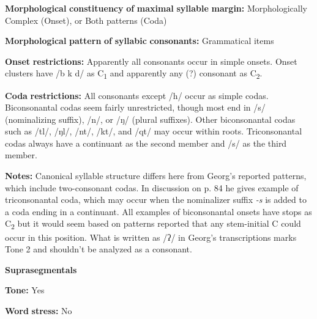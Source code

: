 \begin{styleBody}
\textbf{Morphological} \textbf{constituency} \textbf{of} \textbf{maximal} \textbf{syllable} \textbf{margin:} Morphologically Complex (Onset), or Both patterns (Coda)
\end{styleBody}

\begin{styleBody}
\textbf{Morphological} \textbf{pattern} \textbf{of} \textbf{syllabic} \textbf{consonants:} Grammatical items
\end{styleBody}

\begin{styleBody}
\textbf{Onset} \textbf{restrictions:} Apparently all consonants occur in simple onsets. Onset clusters have /b k d/ as C\textsubscript{1} and apparently any (?) consonant as C\textsubscript{2}.
\end{styleBody}

\begin{styleBody}
\textbf{Coda} \textbf{restrictions:} All consonants except /h/ occur as simple codas. Biconsonantal codas seem fairly unrestricted, though most end in /s/ (nominalizing suffix), /n/, or /ŋ/ (plural suffixes). Other biconsonantal codas such as /tl/, /ŋl/, /nt/, /kt/, and /qt/ may occur within roots. Triconsonantal codas always have a continuant as the second member and /s/ as the third member.
\end{styleBody}

\begin{styleBody}
\textbf{Notes:} Canonical syllable structure differs here from Georg’s reported patterns, which include two-consonant codas. In discussion on p. 84 he gives example of triconsonantal coda, which may occur when the nominalizer suffix \textit{{}-s} is added to a coda ending in a continuant. All examples of biconsonantal onsets have stops as C\textsubscript{2} but it would seem based on patterns reported that any stem-initial C could occur in this position. What is written as /ʔ/ in Georg’s transcriptions marks Tone 2 and shouldn’t be analyzed as a consonant.
\end{styleBody}

\begin{styleBody}
\textbf{Suprasegmentals}
\end{styleBody}

\begin{styleBody}
\textbf{Tone:} Yes
\end{styleBody}

\begin{styleBody}
\textbf{Word} \textbf{stress:} No
\end{styleBody}

